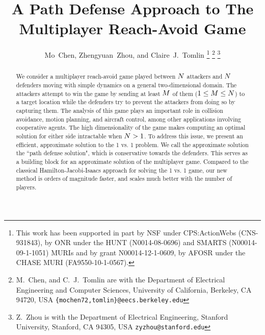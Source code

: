 \documentclass[letterpaper, 10 pt, conference]{ieeeconf}  %
\title{\LARGE \bf
A Path Defense Approach to The Multiplayer Reach-Avoid Game
}
\author{Mo~Chen, Zhengyuan~Zhou, and Claire~J.~Tomlin%
\thanks{This work has been supported in part by NSF under CPS:ActionWebs (CNS-931843), by ONR under the HUNT (N0014-08-0696) and SMARTS (N00014-09-1-1051) MURIs and by grant N00014-12-1-0609, by AFOSR under the CHASE MURI (FA9550-10-1-0567).}%
\thanks{M.~Chen, and C.~J.~Tomlin are with the Department of Electrical Engineering and Computer Sciences,
        University of California, Berkeley, CA 94720, USA
        {\tt\small \{mochen72,tomlin\}@eecs.berkeley.edu}}
\thanks{Z.~Zhou is with the Department of Electrical Engineering,
        Stanford University, Stanford, CA 94305, USA
        {\tt\small zyzhou@stanford.edu}}   
}
\numberwithin{algorithm}{section}
\begin{document}
\maketitle

\thispagestyle{empty}
\pagestyle{empty}

\begin{abstract}
We consider a multiplayer reach-avoid game played between $N$ attackers and $N$ defenders moving with simple dynamics on a general two-dimensional domain. The attackers attempt to win the game by sending at least $M$ of them ($1\le M\le N$) to a target location while the defenders try to prevent the attackers from doing so by capturing them. The analysis of this game plays an important role in collision avoidance, motion planning, and aircraft control, among other applications involving cooperative agents. The high dimensionality of the game makes computing an optimal solution for either side intractable when $N>1$. To address this issue, we present an efficient, approximate solution to the 1 vs. 1 problem. We call the approximate solution the ``path defense solution", which is conservative towards the defenders. This serves as a building block for an approximate solution of the multiplayer game. Compared to the classical Hamilton-Jacobi-Isaacs approach for solving the 1 vs. 1 game, our new method is orders of magnitude faster, and scales much better with the number of players.
\end{abstract}







%





\end{document}
